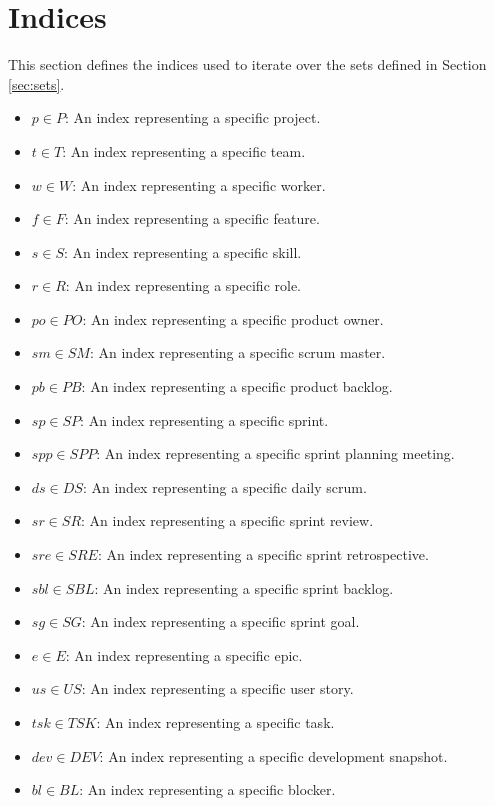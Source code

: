 \documentclass{article}
\begin{document}
\section{Indices}
\label{sec:indices}
This section defines the indices used to iterate over the sets defined in Section \ref{sec:sets}.
\begin{itemize}
    \item $p \in P$: An index representing a specific project.
    \item $t \in T$: An index representing a specific team.
    \item $w \in W$: An index representing a specific worker.
    \item $f \in F$: An index representing a specific feature.
    \item $s \in S$: An index representing a specific skill.
    \item $r \in R$: An index representing a specific role.
    \item $po \in PO$: An index representing a specific product owner.
    \item $sm \in SM$: An index representing a specific scrum master.
    \item $pb \in PB$: An index representing a specific product backlog.
    \item $sp \in SP$: An index representing a specific sprint.
    \item $spp \in SPP$: An index representing a specific sprint planning meeting.
    \item $ds \in DS$: An index representing a specific daily scrum.
    \item $sr \in SR$: An index representing a specific sprint review.
    \item $sre \in SRE$: An index representing a specific sprint retrospective.
    \item $sbl \in SBL$: An index representing a specific sprint backlog.
    \item $sg \in SG$: An index representing a specific sprint goal.
    \item $e \in E$: An index representing a specific epic.
    \item $us \in US$: An index representing a specific user story.
    \item $tsk \in TSK$: An index representing a specific task.
    \item $dev \in DEV$: An index representing a specific development snapshot.
    \item $bl \in BL$: An index representing a specific blocker.

\end{itemize}
\end{document}
